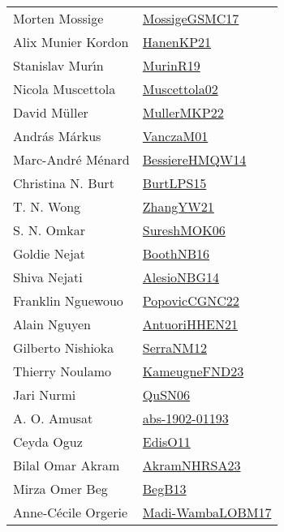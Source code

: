 {\begin{longtable}{p{4cm}p{20cm}}
Morten Mossige & \href{papers/MossigeGSMC17.pdf}{MossigeGSMC17}\cite{MossigeGSMC17} \\
Alix Munier Kordon & \href{papers/HanenKP21.pdf}{HanenKP21}\cite{HanenKP21} \\
Stanislav Mur{\'{\i}}n & \href{papers/MurinR19.pdf}{MurinR19}\cite{MurinR19} \\
Nicola Muscettola & \href{papers/Muscettola02.pdf}{Muscettola02}\cite{Muscettola02} \\
David M{\"{u}}ller & \href{articles/MullerMKP22.pdf}{MullerMKP22}\cite{MullerMKP22} \\
Andr{\'{a}}s M{\'{a}}rkus & \href{papers/VanczaM01.pdf}{VanczaM01}\cite{VanczaM01} \\
Marc{-}Andr{\'{e}} M{\'{e}}nard & \href{papers/BessiereHMQW14.pdf}{BessiereHMQW14}\cite{BessiereHMQW14} \\
Christina N. Burt & \href{papers/BurtLPS15.pdf}{BurtLPS15}\cite{BurtLPS15} \\
T. N. Wong & \href{articles/ZhangYW21.pdf}{ZhangYW21}\cite{ZhangYW21} \\
S. N. Omkar & \href{}{SureshMOK06}\cite{SureshMOK06} \\
Goldie Nejat & \href{papers/BoothNB16.pdf}{BoothNB16}\cite{BoothNB16} \\
Shiva Nejati & \href{papers/AlesioNBG14.pdf}{AlesioNBG14}\cite{AlesioNBG14} \\
Franklin Nguewouo & \href{papers/PopovicCGNC22.pdf}{PopovicCGNC22}\cite{PopovicCGNC22} \\
Alain Nguyen & \href{papers/AntuoriHHEN21.pdf}{AntuoriHHEN21}\cite{AntuoriHHEN21} \\
Gilberto Nishioka & \href{papers/SerraNM12.pdf}{SerraNM12}\cite{SerraNM12} \\
Thierry Noulamo & \href{papers/KameugneFND23.pdf}{KameugneFND23}\cite{KameugneFND23} \\
Jari Nurmi & \href{papers/QuSN06.pdf}{QuSN06}\cite{QuSN06} \\
A. O. Amusat & \href{articles/abs-1902-01193.pdf}{abs-1902-01193}\cite{abs-1902-01193} \\
Ceyda Oguz & \href{papers/EdisO11.pdf}{EdisO11}\cite{EdisO11} \\
Bilal Omar Akram & \href{articles/AkramNHRSA23.pdf}{AkramNHRSA23}\cite{AkramNHRSA23} \\
Mirza Omer Beg & \href{}{BegB13}\cite{BegB13} \\
Anne{-}C{\'{e}}cile Orgerie & \href{papers/Madi-WambaLOBM17.pdf}{Madi-WambaLOBM17}\cite{Madi-WambaLOBM17} \\

\end{longtable}}
